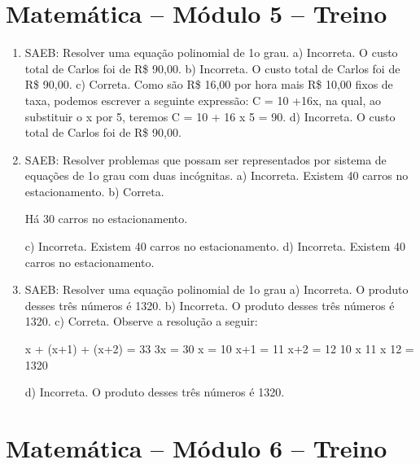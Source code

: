 \section*{Matemática – Módulo 5 – Treino}

\begin{enumerate}
\item
SAEB: Resolver uma equação polinomial de 1o grau.
a) Incorreta. O custo total de Carlos foi de R\$ 90,00.
b) Incorreta. O custo total de Carlos foi de R\$ 90,00.
c) Correta. Como são R\$ 16,00 por hora mais R\$ 10,00 fixos de taxa, 
podemos escrever a seguinte expressão: C = 10 +16x, na qual, ao substituir 
o x por 5, teremos C = 10 + 16 x 5 = 90.
d) Incorreta. O custo total de Carlos foi de R\$ 90,00.

\item
SAEB: Resolver problemas que possam ser representados por sistema de equações de 1o grau com duas incógnitas.
a) Incorreta. Existem 40 carros no estacionamento.
b) Correta.
%
%
%
%
%
%

Há 30 carros no estacionamento.

c) Incorreta. Existem 40 carros no estacionamento. 
d) Incorreta. Existem 40 carros no estacionamento. 

\item
SAEB: Resolver uma equação polinomial de 1o grau
a) Incorreta. O produto desses três números é 1320.
b) Incorreta. O produto desses três números é 1320.
c) Correta. Observe a resolução a seguir:

x + (x+1) + (x+2) = 33
3x = 30
x = 10
x+1 = 11
x+2 = 12
10 x 11 x 12 = 1320

d) Incorreta. O produto desses três números é 1320.
\end{enumerate}

\section*{Matemática – Módulo 6 – Treino}

